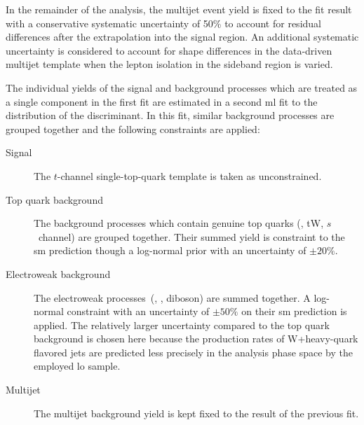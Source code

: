 
In the remainder of the analysis, the multijet event yield is fixed to the fit result with a conservative systematic uncertainty of 50\% to account for residual differences after the extrapolation into the signal region. An additional systematic uncertainty is considered to account for shape differences in the data-driven multijet template when the lepton isolation in the sideband region is varied.

The individual yields of the signal and background processes which are treated as a single component in the first fit are estimated in a second \gls{ml} fit to the distribution of the \bdttch discriminant. In this fit, similar background processes are grouped together and the following constraints are applied:

\begin{description}
\item[Signal] The $t$-channel single-top-quark template is taken as unconstrained.
\item[Top quark background] The background processes which contain genuine top quarks (\ttbar, tW, $s$~channel) are grouped together. Their summed yield is constraint to the \gls{sm} prediction though a log-normal prior with an uncertainty of $\pm20\%$.
\item[Electroweak background] The electroweak processes~(\wjets, \zjets, diboson) are summed together. A log-normal constraint with an uncertainty of $\pm50\%$ on their \gls{sm} prediction is applied. The relatively larger uncertainty compared to the top quark background is chosen here because the production rates of W+heavy-quark flavored jets are predicted less precisely in the analysis phase space by the employed \wjets \gls{lo} \MG sample.
\item[Multijet] The multijet background yield is kept fixed to the result of the previous fit.
\end{description}

